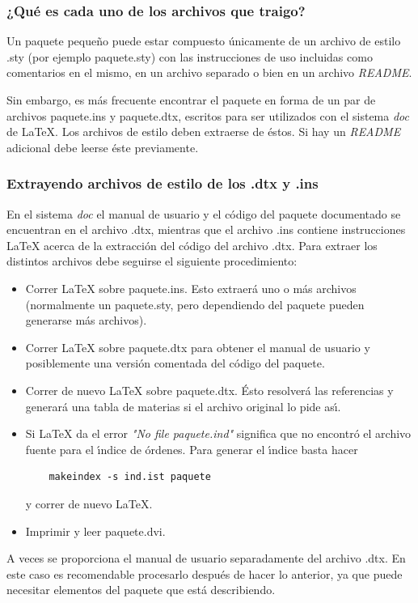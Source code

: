 	\subsubsection{¿Qu\'e es cada uno de los archivos que traigo?}

	Un paquete peque\~no puede estar compuesto \'unicamente de un archivo de estilo
	{\ttfamily .sty} (por ejemplo {\ttfamily paquete.sty}) con las instrucciones de uso
	incluidas como comentarios en el mismo, en un archivo separado o bien en un
	archivo {\itshape README\/}.

	Sin embargo, es m\'as frecuente encontrar el paquete en forma de un par de
	archivos {\ttfamily paquete.ins} y {\ttfamily paquete.dtx}, escritos para ser utilizados con
	el sistema {\itshape doc\/} de \LaTeX{}. Los archivos de estilo deben extraerse de
	\'estos. Si hay un {\itshape README\/} adicional debe leerse \'este previamente.

	\subsubsection[Extrayendo archivos de estilo de los .dtx y .ins]{Extrayendo archivos de estilo de los {\protect\ttfamily .dtx} y {\protect\ttfamily .ins}}\label{dtx-extraer}

	En el sistema {\itshape doc\/} el manual de usuario y el c\'odigo del paquete
	documentado se encuentran en el archivo {\ttfamily .dtx}, mientras que el archivo
	{\ttfamily .ins} contiene instrucciones \LaTeX{} acerca de la extracci\'on del c\'odigo
	del archivo {\ttfamily .dtx}. Para extraer los distintos archivos debe seguirse el
	siguiente procedimiento:
	\begin{itemize}
	\item Correr \LaTeX{} sobre {\ttfamily paquete.ins}. Esto extraer\'a uno o m\'as archivos
	(normalmente un {\ttfamily paquete.sty}, pero dependiendo del paquete pueden
	generarse m\'as archivos).
	\item Correr \LaTeX{} sobre {\ttfamily paquete.dtx} para obtener el manual de usuario y
	posiblemente una versi\'on comentada del c\'odigo del paquete.
	\item Correr de nuevo \LaTeX{} sobre {\ttfamily paquete.dtx}. \'Esto resolver\'a las
	referencias y generar\'a una tabla de materias si el archivo original lo pide
	as\'\i{}.
	\item Si \LaTeX{} da el error {\itshape "No file paquete.ind"\/} significa que no encontr\'o
	el archivo fuente para el \'\i{}ndice de \'ordenes. Para generar el \'\i{}ndice basta
	hacer
	\begin{verbatim}
	makeindex -s ind.ist paquete
	\end{verbatim}
 	y correr de nuevo \LaTeX{}.
	\item  Imprimir y leer {\ttfamily paquete.dvi}.
	\end{itemize}
 	A veces se proporciona el manual de usuario separadamente del archivo
	{\ttfamily .dtx}. En este caso es recomendable procesarlo despu\'es de hacer lo
	anterior, ya que puede necesitar elementos del paquete que est\'a describiendo.

